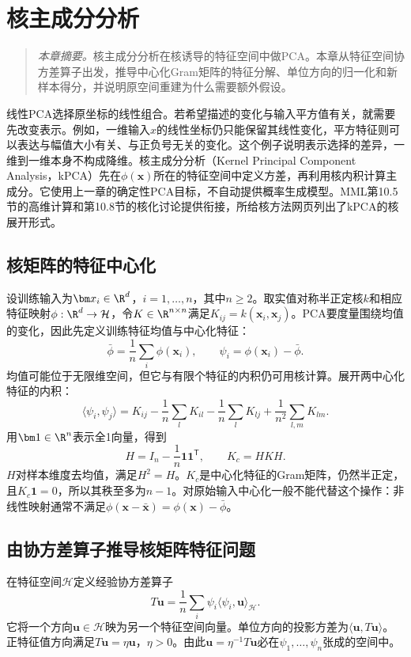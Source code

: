 \chapter{核主成分分析}
\label{chap:kpca}
\begin{quote}\small
\textit{本章摘要。}核主成分分析在核诱导的特征空间中做PCA。本章从特征空间协方差算子出发，推导中心化Gram矩阵的特征分解、单位方向的归一化和新样本得分，并说明原空间重建为什么需要额外假设。
\end{quote}

线性PCA选择原坐标的线性组合。若希望描述的变化与输入平方值有关，就需要先改变表示。例如，一维输入$x$的线性坐标仍只能保留其线性变化，平方特征则可以表达与幅值大小有关、与正负号无关的变化。这个例子说明表示选择的差异，一维到一维本身不构成降维。核主成分分析（Kernel Principal Component Analysis，kPCA）先在$\phi(\bm x)$所在的特征空间中定义方差，再利用核内积计算主成分\cite{scholkopf1998kpca}。它使用上一章的确定性PCA目标，不自动提供概率生成模型。MML第10.5节的高维计算和第10.8节的核化讨论提供衔接，所给核方法网页列出了kPCA的核展开形式\cite{deisenroth2020mml,zheng2021kernel}。

\section{核矩阵的特征中心化}
设训练输入为$\bm x_i\in\R^d$，$i=1,\ldots,n$，其中$n\ge2$。取实值对称半正定核$k$和相应特征映射$\phi:\R^d\to\mathcal H$，令$K\in\R^{n\times n}$满足$K_{ij}=k(\bm x_i,\bm x_j)$。PCA要度量围绕均值的变化，因此先定义训练特征均值与中心化特征：
\begin{equation}
 \bar\phi=\frac1n\sum_i\phi(\bm x_i),\qquad
 \psi_i=\phi(\bm x_i)-\bar\phi.
\end{equation}
均值可能位于无限维空间，但它与有限个特征的内积仍可用核计算。展开两中心化特征的内积：
\begin{equation}
 \langle\psi_i,\psi_j\rangle
 =K_{ij}-\frac1n\sum_lK_{il}-\frac1n\sum_lK_{lj}
 +\frac1{n^2}\sum_{l,m}K_{lm}.
\end{equation}
用$\bm1\in\R^n$表示全1向量，得到
\begin{equation}
 H=I_n-\frac1n\bm1\bm1^{\mathsf T},\qquad K_c=HKH.
 \label{eq:kpca-centered-gram}
\end{equation}
$H$对样本维度去均值，满足$H^2=H$。$K_c$是中心化特征的Gram矩阵，仍然半正定，且$K_c\bm1=0$，所以其秩至多为$n-1$。对原始输入中心化一般不能代替这个操作：非线性映射通常不满足$\phi(\bm x-\bar{\bm x})=\phi(\bm x)-\bar\phi$。

\section{由协方差算子推导核矩阵特征问题}
在特征空间$\mathcal H$定义经验协方差算子
\begin{equation}
 T\bm u=\frac1n\sum_i\psi_i\langle\psi_i,\bm u\rangle_{\mathcal H}.
 \label{eq:kpca-covariance-operator}
\end{equation}
它将一个方向$\bm u\in\mathcal H$映为另一个特征空间向量。单位方向的投影方差为$\langle\bm u,T\bm u\rangle$。正特征值方向满足$T\bm u=\eta\bm u$，$\eta>0$。由此$\bm u=\eta^{-1}T\bm u$必在$\psi_1,\ldots,\psi_n$张成的空间中。

